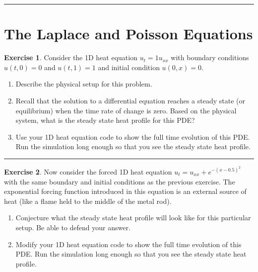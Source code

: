 \documentclass[
]{book}
\providecommand{\tightlist}{%
  \setlength{\itemsep}{0pt}\setlength{\parskip}{0pt}}
\theoremstyle{definition}
\theoremstyle{definition}
\theoremstyle{definition}
\newtheorem{exercise}{Exercise}[chapter]
\theoremstyle{remark}
\begin{document}
\begin{center}\rule{0.5\linewidth}{0.5pt}\end{center}

\hypertarget{the-laplace-and-poisson-equations}{%
\section{The Laplace and Poisson Equations}\label{the-laplace-and-poisson-equations}}

\begin{exercise}
\protect\hypertarget{exr:unnamed-chunk-594}{}{\label{exr:unnamed-chunk-594} }Consider the 1D heat equation \(u_t = 1 u_{xx}\) with boundary conditions \(u(t,0) = 0\) and \(u(t,1)=1\) and initial condition \(u(0,x) = 0\).

\begin{enumerate}
\def\labelenumi{\alph{enumi}.}
\tightlist
\item
  Describe the physical setup for this problem.\\
\item
  Recall that the solution to a differential equation reaches a steady state (or equilibrium) when the time rate of change is zero. Based on the physical system, what is the steady state heat profile for this PDE?
\item
  Use your 1D heat equation code to show the full time evolution of this PDE. Run the simulation long enough so that you see the steady state heat profile.
\end{enumerate}
\end{exercise}

\begin{center}\rule{0.5\linewidth}{0.5pt}\end{center}

\begin{exercise}
\protect\hypertarget{exr:unnamed-chunk-595}{}{\label{exr:unnamed-chunk-595} }Now consider the forced 1D heat equation \(u_t = u_{xx} + e^{-(x-0.5)^2}\) with the same boundary and initial conditions as the previous exercise. The exponential forcing function introduced in this equation is an external source of heat (like a flame held to the middle of the metal rod).

\begin{enumerate}
\def\labelenumi{\alph{enumi}.}
\tightlist
\item
  Conjecture what the steady state heat profile will look like for this particular setup. Be able to defend your answer.
\item
  Modify your 1D heat equation code to show the full time evolution of this PDE. Run the simulation long enough so that you see the steady state heat profile.
\end{enumerate}
\end{exercise}
\end{document}
